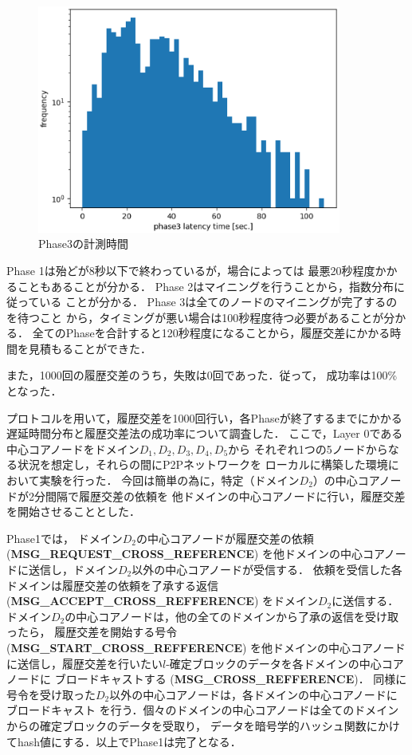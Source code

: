 \documentclass[a4paper,12pt]{jsarticle}
\begin{document}
\begin{figure}[H]%
  \begin{center}
    \includegraphics[width=100mm]{pht/phase3-sec-hist.eps}
  \end{center}
  \caption{Phase3の計測時間}
  \label{fig:phase3}
\end{figure}
%
Phase 1は殆どが8秒以下で終わっているが，場合によっては
最悪20秒程度かかることもあることが分かる．
Phase 2はマイニングを行うことから，指数分布に従っている
ことが分かる．
Phase 3は全てのノードのマイニングが完了するのを待つこと
から，タイミングが悪い場合は100秒程度待つ必要があることが分かる．
全てのPhaseを合計すると120秒程度になることから，履歴交差にかかる時間を見積もることができた．

また，1000回の履歴交差のうち，失敗は0回であった．従って，
成功率は100\%となった．

プロトコルを用いて，履歴交差を1000回行い，各Phaseが終了するまでにかかる
遅延時間分布と履歴交差法の成功率について調査した．
ここで，Layer 0である中心コアノードをドメイン$D_1, D_2, D_3, D_4, D_5$から
それぞれ1つの5ノードからなる状況を想定し，それらの間にP2Pネットワークを
ローカルに構築した環境において実験を行った．
今回は簡単の為に，特定（ドメイン$D_2$）の中心コアノードが2分間隔で履歴交差の依頼を
他ドメインの中心コアノードに行い，履歴交差を開始させることとした．

Phase1では，
ドメイン$D_2$の中心コアノードが履歴交差の依頼 (\textbf{MSG\_REQUEST\_CROSS\_REFERENCE})
を他ドメインの中心コアノードに送信し，ドメイン$D_2$以外の中心コアノードが受信する．
依頼を受信した各ドメインは履歴交差の依頼を了承する返信 (\textbf{MSG\_ACCEPT\_CROSS\_REFFERENCE})
をドメイン$D_2$に送信する．
ドメイン$D_2$の中心コアノードは，他の全てのドメインから了承の返信を受け取ったら，
履歴交差を開始する号令 (\textbf{MSG\_START\_CROSS\_REFFERENCE}) を他ドメインの中心コアノード
に送信し，履歴交差を行いたい$l$-確定ブロックのデータを各ドメインの中心コアノードに
ブロードキャストする (\textbf{MSG\_CROSS\_REFFERENCE})．
同様に号令を受け取った$D_2$以外の中心コアノードは，各ドメインの中心コアノードにブロードキャスト
を行う．個々のドメインの中心コアノードは全てのドメインからの確定ブロックのデータを受取り，
データを暗号学的ハッシュ関数にかけてhash値にする．以上でPhase1は完了となる．
\end{document}
